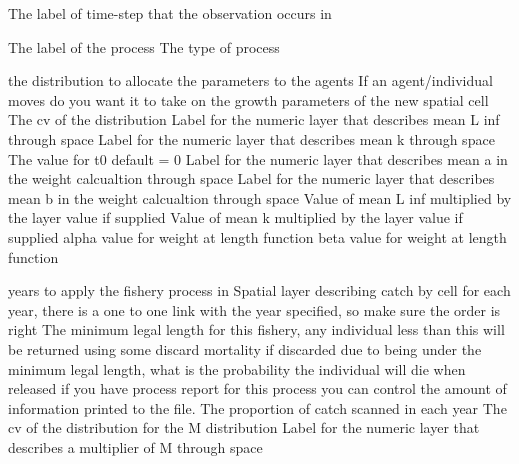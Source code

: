  {The label of time-step that the observation occurs in}
\par\par
{} {The label of the process}
 {The type of process}
\par\textbf{}\par
{} {the distribution to allocate the parameters to the agents}
 {If an agent/individual moves do you want it to take on the growth parameters of the new spatial cell}
 {The cv of the distribution}
 {Label for the numeric layer that describes mean L inf through space}
 {Label for the numeric layer that describes mean k through space}
 {The value for t0 default = 0}
 {Label for the numeric layer that describes mean a in the weight calcualtion through space}
 {Label for the numeric layer that describes mean b in the weight calcualtion through space}
 {Value of mean L inf multiplied by the layer value if supplied}
 {Value of mean k multiplied by the layer value if supplied}
 {alpha value for weight at length function}
 {beta value for weight at length function}
\par\textbf{}\par
\par\textbf{}\par
{} {years to apply the fishery process in}
 {Spatial layer describing catch by cell for each year, there is a one to one link with the year specified, so make sure the order is right}
 {The minimum legal length for this fishery, any individual less than this will be returned using some discard mortality}
 {if discarded due to being under the minimum legal length, what is the probability the individual will die when released}
 {if you have process report for this process you can control the amount of information printed to the file.}
 {The proportion of catch scanned in each year}
 {The cv of the distribution for the M distribution}
 {Label for the numeric layer that describes a multiplier of M through space}
